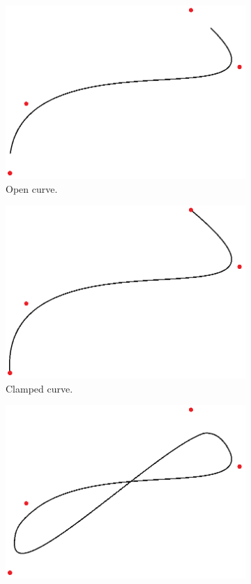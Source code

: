 \documentclass{article}
\begin{document}
\begin{figure}[H]
\centering
\begin{subfigure}[b]{0.32\textwidth}
\includegraphics[width=\textwidth]{open}
\caption{Open curve.}
\label{open}
\end{subfigure}
\begin{subfigure}[b]{0.32\textwidth}
\includegraphics[width=\textwidth]{clamped}
\caption{Clamped curve.}
\label{clamped}
\end{subfigure}
\begin{subfigure}[b]{0.32\textwidth}
\includegraphics[width=\textwidth]{closed}

\end{subfigure}
\end{figure}
\end{document}
